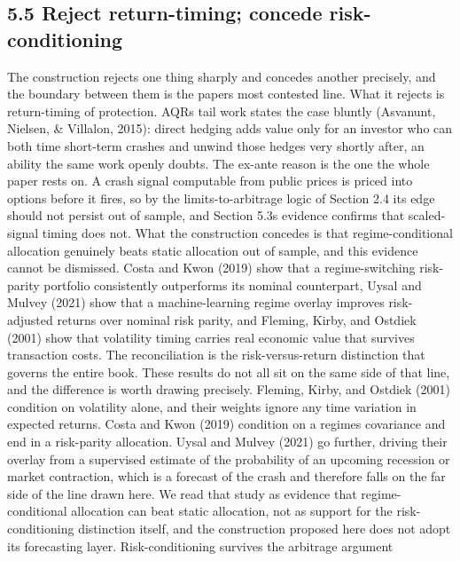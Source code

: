 \documentclass[12pt, a4paper]{article}
\begin{document}
\subsection*{5.5 Reject return-timing; concede
risk-conditioning}\label{reject-return-timing-concede-risk-conditioning}

The construction rejects one thing sharply and concedes another
precisely, and the boundary between them is the paper\textquotesingle s
most contested line. What it rejects is return-timing of protection.
AQR\textquotesingle s tail work states the case bluntly (Asvanunt,
Nielsen, \& Villalon, 2015): direct hedging adds value only for an
investor who can both time short-term crashes and unwind those hedges
very shortly after, an ability the same work openly doubts. The ex-ante
reason is the one the whole paper rests on. A crash signal computable
from public prices is priced into options before it fires, so by the
limits-to-arbitrage logic of Section 2.4 its edge should not persist out
of sample, and Section 5.3\textquotesingle s evidence confirms that
scaled-signal timing does not. What the construction concedes is that
regime-conditional allocation genuinely beats static allocation out of
sample, and this evidence cannot be dismissed. Costa and Kwon (2019)
show that a regime-switching risk-parity portfolio consistently
outperforms its nominal counterpart, Uysal and Mulvey (2021) show that a
machine-learning regime overlay improves risk-adjusted returns over
nominal risk parity, and Fleming, Kirby, and Ostdiek (2001) show that
volatility timing carries real economic value that survives transaction
costs. The reconciliation is the risk-versus-return distinction that
governs the entire book. These results do not all sit on the same side
of that line, and the difference is worth drawing precisely. Fleming,
Kirby, and Ostdiek (2001) condition on volatility alone, and their
weights ignore any time variation in expected returns. Costa and Kwon
(2019) condition on a regime\textquotesingle s covariance and end in a
risk-parity allocation. Uysal and Mulvey (2021) go further, driving
their overlay from a supervised estimate of the probability of an
upcoming recession or market contraction, which is a forecast of the
crash and therefore falls on the far side of the line drawn here. We
read that study as evidence that regime-conditional allocation can beat
static allocation, not as support for the risk-conditioning distinction
itself, and the construction proposed here does not adopt its
forecasting layer. Risk-conditioning survives the arbitrage argument
\end{document}
